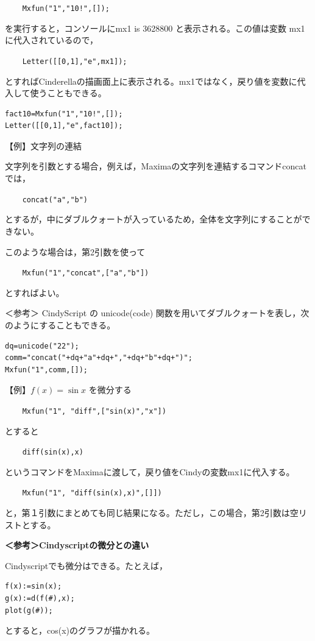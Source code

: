 \documentclass[papersize,a4paper,12pt,uplatex]{jsarticle}
\begin{document}
\begin{description}
\verb|    Mxfun("1","10!",[]);|

を実行すると，コンソールにmx1 is 3628800 と表示される。この値は変数 mx1 に代入されているので，

\verb|    Letter([[0,1],"e",mx1]);|

とすればCinderellaの描画面上に表示される。mx1ではなく，戻り値を変数に代入して使うこともできる。

\begin{verbatim}
fact10=Mxfun("1","10!",[]);
Letter([[0,1],"e",fact10]);
\end{verbatim}

\vspace{\baselineskip}
【例】文字列の連結

文字列を引数とする場合，例えば，Maximaの文字列を連結するコマンドconcatでは，

\verb|    concat("a","b")|

とするが，中にダブルクォートが入っているため，全体を文字列にすることができない。

このような場合は，第2引数を使って

\verb|    Mxfun("1","concat",["a","b"])|
 
とすればよい。

\vspace{\baselineskip}
＜参考＞ CindyScript の unicode(code)  関数を用いてダブルクォートを表し，次のようにすることもできる。

\begin{verbatim}
dq=unicode("22");
comm="concat("+dq+"a"+dq+","+dq+"b"+dq+")";
Mxfun("1",comm,[]);
\end{verbatim}

\vspace{\baselineskip}
【例】$f(x)=\sin x$ を微分する

\verb|    Mxfun("1", "diff",["sin(x)","x"])|

とすると

\verb|    diff(sin(x),x)|

というコマンドをMaximaに渡して，戻り値をCindyの変数mx1に代入する。

\verb|    Mxfun("1", "diff(sin(x),x)",[]])|

と，第１引数にまとめても同じ結果になる。ただし，この場合，第2引数は空リストとする。

\vspace{\baselineskip}
{\bf ＜参考＞Cindyscriptの微分との違い}

Cindyscriptでも微分はできる。たとえば，
\begin{verbatim}
f(x):=sin(x);
g(x):=d(f(#),x);
plot(g(#));
\end{verbatim}
とすると，cos(x)のグラフが描かれる。


\end{description}
\end{document}
